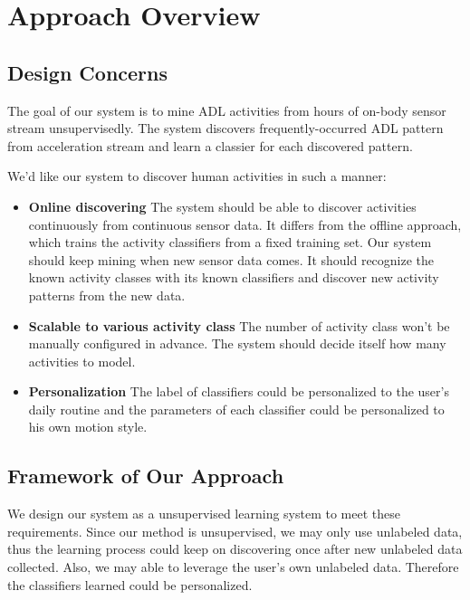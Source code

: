 \documentclass{sigchi}
\begin{document}
\section{Approach Overview}
\label{sec.overview}

    \subsection{Design Concerns}
    The goal of our system is to mine ADL activities from hours of on-body sensor stream unsupervisedly.
    The system discovers frequently-occurred ADL pattern from acceleration stream and learn a classier for each discovered pattern.

    We'd like our system to discover human activities in such a manner:
    \begin{itemize}
        \item \textbf{Online discovering}
        The system should be able to discover activities continuously from continuous sensor data.
        It differs from the offline approach, which trains the activity classifiers from a fixed training set.
        Our system should keep mining when new sensor data comes.
        It should recognize the known activity classes with its known classifiers and discover new activity patterns from the new data.

        \item \textbf{Scalable to various activity class}
        The number of activity class won't be manually configured in advance.
        The system should decide itself how many activities to model.

        \item \textbf{Personalization}
        The label of classifiers could be personalized to the user's daily routine and the parameters of each classifier could be personalized to his own motion style.
    \end{itemize}

\subsection{Framework of Our Approach}

    We design our system as a unsupervised learning system to meet these requirements.
    Since our method is unsupervised, we may only use unlabeled data, thus the learning process could keep on discovering once after new unlabeled data collected.
    Also, we may able to leverage the user's own unlabeled data.
    Therefore the classifiers learned could be personalized.
\end{document}
